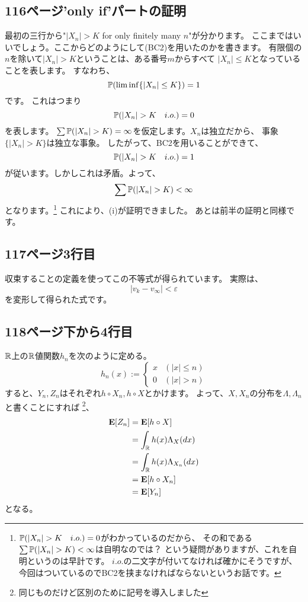  \subsection{116ページ'only if'パートの証明}
    最初の三行から"$|X_n|> K$ for only finitely many $n$"が分かります。
    ここまではいいでしょう。ここからどのようにして(BC2)を用いたのかを書きます。
    有限個の$n$を除いて$|X_n|> K$ということは、ある番号$m$からすべて
    $|X_n| \leq K$となっていることを表します。
    すなわち、
    \[
      {\mathbb{P}}(\liminf \{|X_n| \leq K\}) = 1
    \]
    です。
    これはつまり
    \[
      {\mathbb{P}}(|X_n| > K \quad i.o.) = 0
    \]
    を表します。
    $\sum {\mathbb{P}}(|X_n| > K ) = \infty$を仮定します。$X_n$は独立だから、
    事象$\{|X_n| > K\}$は独立な事象。
    したがって、BC2を用いることができて、
    \[
      {\mathbb{P}}(|X_n| > K \quad i.o.) = 1
    \]
    が従います。しかしこれは矛盾。よって、
    \[
      \sum {\mathbb{P}}(|X_n| > K ) < \infty
    \]
    となります。\footnote{${\mathbb{P}}(|X_n| > K \quad i.o.) = 0$がわかっているのだから、
    その和である$\sum {\mathbb{P}}(|X_n| > K ) < \infty$は自明なのでは？
    という疑問がありますが、これを自明というのは早計です。
    $i.o.$の二文字が付いてなければ確かにそうですが、
    今回はついているのでBC2を挟まなければならないというお話です。}
    これにより、(i)が証明できました。
    あとは前半の証明と同様です。

  \subsection{117ページ3行目}
    収束することの定義を使ってこの不等式が得られています。
    実際は、
    \[
      |v_k - v_{\infty}| < \varepsilon
    \]
    を変形して得られた式です。

  \subsection{118ページ下から4行目}
    ${\mathbb{R}}$上の${\mathbb{R}}$値関数$h_n$を次のように定める。
    \[
      h_n(x) := \begin{cases}
        x & (|x| \leq n) \\
        0 & (|x| > n)
    \end{cases}
    \]
    すると、$Y_n,Z_n$はそれぞれ$h \circ X_n, h \circ X$とかけます。
    よって、$X,X_n$の分布を$\Lambda, \Lambda_n$と書くことにすれば
    \footnote{同じものだけど区別のために記号を導入しました}、
    \begin{align*}
      {\mathbf{E}}[Z_n] &= {\mathbf{E}}[h \circ X] \\
      &= \int_{{\mathbb{R}}} h(x) \Lambda_X(dx) \\
      &= \int_{{\mathbb{R}}} h(x) \Lambda_{X_n}(dx) \\
      &= {\mathbf{E}}[h \circ X_n]\\
      &= {\mathbf{E}}[Y_n]
    \end{align*}
    となる。

